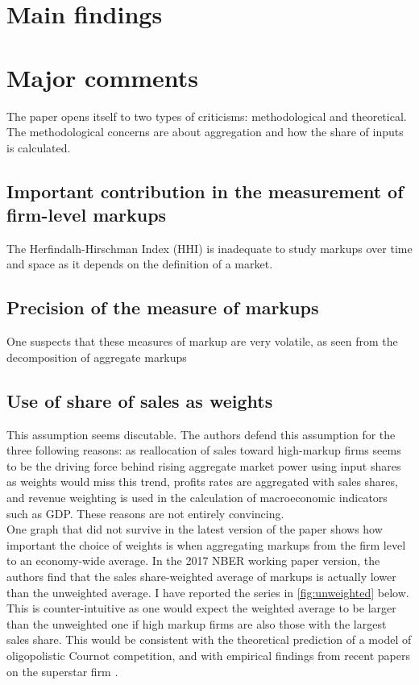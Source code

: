 \documentclass{amsart}
\theoremstyle{definition}
\theoremstyle{remark}
\numberwithin{equation}{section}
\begin{document}
\section{Main findings}



\section{Major comments}

The paper opens itself to two types of criticisms: methodological and theoretical. The methodological concerns are about aggregation and how the share of inputs is calculated.

\subsection*{Important contribution in the measurement of firm-level markups} The Herfindalh-Hirschman Index (HHI) is inadequate to study markups over time and space as it depends on the definition of a market. \cite{de2019rise} \\

\subsection*{Precision of the measure of markups} One suspects that these measures of markup are very volatile, as seen from the decomposition of aggregate markups

\subsection*{Use of share of sales as weights} This assumption seems discutable. The authors defend this assumption for the three following reasons: as reallocation of sales toward high-markup firms seems to be the driving force behind rising aggregate market power using input shares as weights would miss this trend, profits rates are aggregated with sales shares, and revenue weighting is used in the calculation of macroeconomic indicators such as GDP. These reasons are not entirely convincing. \\

One graph that did not survive in the latest version of the paper shows how important the choice of weights is when aggregating markups from the firm level to an economy-wide average. In the 2017 NBER working paper version, the authors find that the sales share-weighted average of markups is actually lower than the unweighted average. I have reported the series in \ref{fig:unweighted} below. This is counter-intuitive as one would expect the weighted average to be larger than the unweighted one if high markup firms are also those with the largest sales share. This would be consistent with the theoretical prediction of a model of oligopolistic Cournot competition, and with empirical findings from recent papers on the superstar firm \cite{autor2019fall}.
\end{document}
